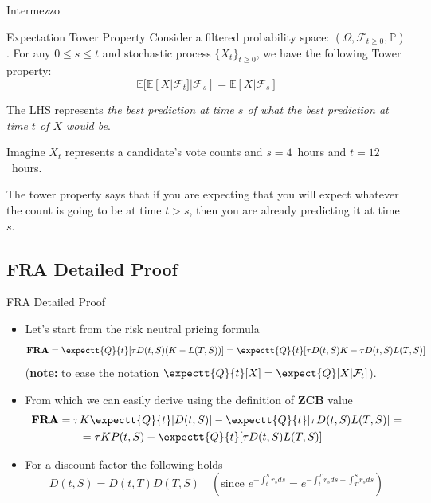 \documentclass{beamer}
\begin{document}
\begin{frame}{Intermezzo}
\begin{block}{Expectation Tower Property}
Consider a filtered probability space: $(\Omega, \mathcal{F}_{t\geq 0}, \mathbb{P})$.
For any $0\leq s \leq t$ and stochastic process $\{X_t\}_{t\geq 0}$, we have the following Tower property:
\begin{equation}	
\mathbb{E}[\mathbb{E}[X|\mathcal{F}_t]|\mathcal{F}_s]=\mathbb{E}[X|\mathcal{F}_s]
\end{equation}
\end{block}
The LHS represents \emph{the best prediction at time $s$ of what the best prediction at time $t$ of $X$ would be}. 

Imagine $X_t$ represents a candidate's vote counts and $s=4$~hours and $t=12$~hours.

The tower property says that if you are expecting that you will expect whatever the count is going to be at time $t>s$, then you are already predicting it at time $s$. 
\end{frame}

\subsection{FRA Detailed Proof}
\begin{frame}{FRA Detailed Proof}
\begin{itemize}
	\item<1-> Let's start from the risk neutral pricing formula
	\begin{equation} \textbf{FRA} = 
\expectt{Q}{t}[\tau D(t,S)(K - L(T,S))] = 	\expectt{Q}{t}[\tau D(t,S)K - \tau D(t,S)L(T,S)]
	\label{eq:fra_as_expectation}
	\end{equation}
	(\textbf{note: } to ease the notation $\expectt{Q}{t}[X] = \expect{Q}[X|\mathcal{F}_t]$).
	\item<2-> From which we can easily derive using the definition of \textbf{ZCB} value
	\begin{equation*}
		\begin{aligned}
		\textbf{FRA} = \tau &K\expectt{Q}{t}[D(t,S)] - \expectt{Q}{t}[\tau D(t,S)L(T,S)] = \\
		&=\tau KP(t,S) - \expectt{Q}{t}[\tau D(t,S)L(T,S)]
		\end{aligned}
	\end{equation*}
	\item<3-> For a discount factor the following holds
	\begin{equation*}
		D(t,S) = D(t,T)D(T,S)\quad(\text{since }e^{-\int_t^S r_s ds} = e^{-\int_t^T r_s ds - \int_T^S r_s ds}) 
	\end{equation*}
\end{itemize}
\end{frame}
\end{document}
